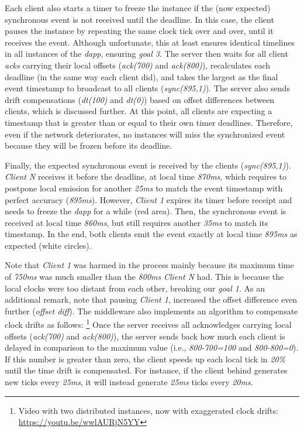 \documentclass[sigplan,screen]{acmart}
\newcommand{\dapp}{\emph{dapp}\xspace}
\begin{document}
Each client also starts a timer to freeze the instance if the (now expected)
synchronous event is not received until the deadline.
In this case, the client pauses the instance by repeating the same clock tick
over and over, until it receives the event.
Although unfortunate, this at least ensures identical timelines in all
instances of the \dapp, ensuring \emph{goal 3}.
%
The server then waits for all client \emph{acks} carrying their local offsets
(\emph{ack(700)} and \emph{ack(800)}), recalculates each deadline (in the same
way each client did), and takes the largest as the final event timestamp to
broadcast to all clients (\emph{sync(895,1)}).
The server also sends drift compensations (\emph{dt(100)} and \emph{dt(0)})
based on offset differences between clients, which is discussed further.
At this point, all clients are expecting a timestamp that is greater than or
equal to their own timer deadlines.
Therefore, even if the network deteriorates, no instances will miss the
synchronized event because they will be frozen before its deadline.

Finally, the expected synchronous event is received by the clients
(\emph{sync(895,1)}).
\emph{Client N} receives it before the deadline, at local time \emph{870ms},
which requires to postpone local emission for another \emph{25ms} to match the
event timestamp with perfect accuracy (\emph{895ms}).
However, \emph{Client 1} expires its timer before receipt and needs to freeze
the \dapp for a while (red area).
Then, the synchronous event is received at local time \emph{860ms}, but still
requires another \emph{35ms} to match its timestamp.
In the end, both clients emit the event exactly at local time \emph{895ms} as
expected (white circles).

Note that \emph{Client 1} was harmed in the process mainly because its maximum
time of \emph{750ms} was much smaller than the \emph{800ms} \emph{Client N}
had.
This is because the local clocks were too distant from each other, breaking our
\emph{goal 1}.
As an additional remark, note that pausing \emph{Client 1}, increased the
offset difference even further (\emph{offset diff}).
%
The middleware also implements an algorithm to compensate clock drifts as
follows:%
\footnote {
    Video with two distributed instances, now with exaggerated clock drifts:
    \url{https://youtu.be/wwlAURjN5YY}
}
Once the server receives all acknowledges carrying local offsets
(\emph{ack(700)} and \emph{ack(800)}), the server sends back how much each
client is delayed in comparison to the maximum value (i.e., \emph{800-700=100}
and \emph{800-800=0}).
If this number is greater than zero, the client speeds up each local tick in
\emph{20\%} until the time drift is compensated.
For instance, if the client behind generates new ticks every \emph{25ms}, it
will instead generate \emph{25ms} ticks every \emph{20ms}.
\end{document}
